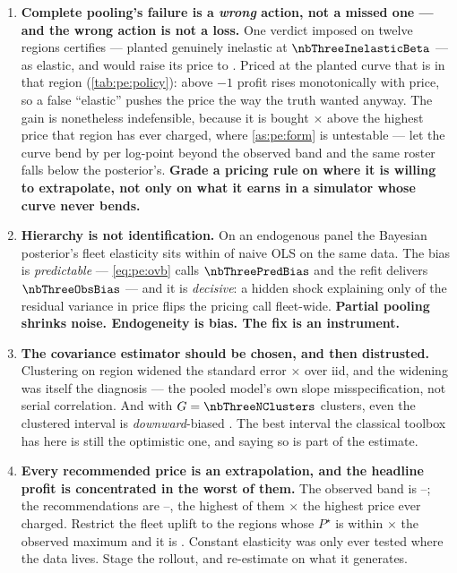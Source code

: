 \begin{enumerate}[leftmargin=*, itemsep=.45em]
  \item \textbf{Complete pooling's failure is a \emph{wrong} action, not a missed one --- and the
        wrong action is not a loss.} One verdict imposed on twelve regions certifies
        \nbThreeInelasticRegion{} --- planted genuinely inelastic at $\nbThreeInelasticBeta$ --- as
        elastic, and would raise its price to \eur{\nbThreeCpPstar}. Priced at the planted curve that
        is \pc{\nbThreeCpWrongGain} in that region (\cref{tab:pe:policy}): above $-1$ profit rises
        monotonically with price, so a false ``elastic'' pushes the price the way the truth wanted
        anyway. The gain is nonetheless indefensible, because it is bought
        \nbThreeCpExtrap$\times$ above the highest price that region has ever charged, where
        \cref{as:pe:form} is untestable --- let the curve bend by \nbThreeBendFlip{} per log-point
        beyond the observed band and the same roster falls below the posterior's. \textbf{Grade a
        pricing rule on where it is willing to extrapolate, not only on what it earns in a
        simulator whose curve never bends.}

  \item \textbf{Hierarchy is not identification.} On an endogenous panel the Bayesian posterior's
        fleet elasticity sits within \nbThreeHierVsOls{} of naive OLS on the same data. The bias is
        \emph{predictable} --- \cref{eq:pe:ovb} calls $\nbThreePredBias$ and the refit delivers
        $\nbThreeObsBias$ --- and it is \emph{decisive}: a hidden shock explaining only
        \pc{\nbThreeKappaCrossShare} of the residual variance in price flips the pricing call
        fleet-wide. \textbf{Partial pooling shrinks noise. Endogeneity is bias. The fix is an
        instrument.}

  \item \textbf{The covariance estimator should be chosen, and then distrusted.} Clustering on
        region widened the standard error \nbThreeSeRatioIid$\times$ over iid, and the widening was
        itself the diagnosis --- the pooled model's own slope misspecification, not serial
        correlation. And with $G = \nbThreeNClusters$ clusters, even the clustered interval is
        \emph{downward}-biased \citep{cameron2015}. The best interval the classical toolbox has here
        is still the optimistic one, and saying so is part of the estimate.

  \item \textbf{Every recommended price is an extrapolation, and the headline profit is concentrated
        in the worst of them.} The observed band is
        \eur{\nbThreePriceObsLo}--\eur{\nbThreePriceObsHi}; the recommendations are
        \eur{\nbThreePstarLo}--\eur{\nbThreePstarHi}, the highest of them
        \nbThreePstarOverBand$\times$ the highest price ever charged. Restrict the
        \pc{\nbThreeFleetUplift} fleet uplift to the \nbThreeNInband{} regions whose $P^\star$ is
        within \nbThreeBandMult$\times$ the observed maximum and it is \pc{\nbThreeUpliftInband}.
        Constant elasticity was only ever tested where the data lives. Stage the rollout, and
        re-estimate on what it generates.


\end{enumerate}
